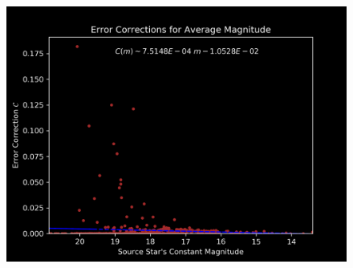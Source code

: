 \documentclass[9pt]{beamer}
\begin{document}
\begin{frame}
\begin{figure}[h]
\centering
\includegraphics[width=\textwidth]{final}
\label{fig:final}
\end{figure}
\end{frame}
\end{document}
